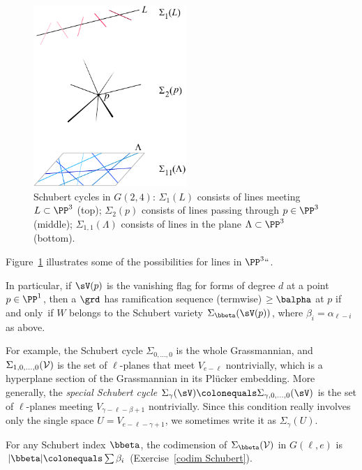 \begin{figure}[b]
\centerline {\includegraphics[height=2.7in]{main/Fig12-2}}
\caption{
Schubert cycles in $G(2,4)$:
$\Sigma_{1}(L)$
consists of
lines meeting $L\subset\PP^3$
(top);
$\Sigma_{2}(p)$
consists of
lines passing through $p\in\PP^3$
(middle);
$\Sigma_{1,1}(\Lambda)$
consists of
 lines in the plane $\Lambda\subset
\PP^3$
(bottom).
}
\label{Schubert cycles in G(2,4)}
\end{figure}

Figure~\ref{Schubert cycles in G(2,4)} illustrates some of
the possibilities for lines in $\PP^3` `$.

In particular, if $\sV(p)$ is the vanishing flag for forms of degree $d$
at a point $p\in \PP^{1}$, then
a $\grd$ has ramification sequence (termwise) $\geq \balpha$ at $p$
%
if and only~if $W$ belongs
to the Schubert variety $\Sigma_{\bbeta}(\sV(p))$, where $\beta_{i} =
\alpha_{\ell-i}$ as above.

For example, the Schubert cycle $\Sigma_{0,\dots,0}$ is the whole
Grassmannian,
%
and $\Sigma_{1,0,\dots,0}(\cal V)$ is the set of $\ell$-planes that meet
$V_{e-\ell}$ nontrivially, which is
a hyperplane section of the Grassmannian in its 
Pl\"ucker embedding.
%
More generally, the
\emph{special Schubert cycle}
%
%
$\Sigma_\gamma(\sV) \colonequals  \Sigma_{\gamma,0,\dots, 0}(\sV)$
is the set of $\ell$-planes
meeting  $V_{\gamma-\ell - \beta+1}$ nontrivially.
Since this condition really involves only the single space $U =
V_{e-\ell-\gamma+1}$, we sometimes
 write it
as $\Sigma_\gamma(U)$.

For any Schubert index $\bbeta$, the codimension of $\Sigma_{\bbeta}({\cal
V})$ in $G(\ell, e)$ is $|{\bbeta}|\colonequals  \sum \beta_i$
(Exercise~\ref{codim Schubert}).


